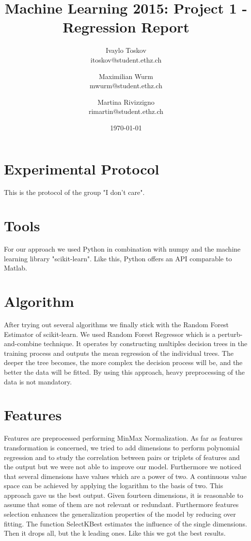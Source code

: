 \documentclass[a4paper, 10pt]{article}
\title{Machine Learning 2015: Project 1 - Regression Report}
\author{Ivaylo Toskov \\ itoskov@student.ethz.ch \and Maximilian Wurm \\ mwurm@student.ethz.ch \and 
	Martina Rivizzigno \\ rimartin@student.ethz.ch\\}
\date{\today}
\begin{document}
\maketitle

\section*{Experimental Protocol}
This is the protocol of the group "I don't care".

\section{Tools}
For our approach we used Python in combination with numpy and the machine learning library "scikit-learn". Like this, Python offers an API comparable to Matlab.

\section{Algorithm}
After trying out several algorithms we finally stick with the Random Forest Estimator of scikit-learn.
We used Random Forest Regressor which is a perturb-and-combine technique. It operates by constructing multiples decision trees in the training process and outputs the mean regression of the individual trees.
The deeper the tree becomes, the more complex the decision process will be, and the better the data will be fitted. By using this approach, heavy preprocessing of the data is not mandatory.

\section{Features}
Features are preprocessed performing MinMax Normalization.
As far as features transformation is concerned, we tried to add dimensions to perform polynomial regression and to study the correlation between pairs or triplets of features and the output but we were not able to improve our model. Furthermore we noticed that several dimensions have values which are a power of two. A continuous value space can be achieved by applying the logarithm to the basis of two. This approach gave us the best output. 
Given fourteen dimensions, it is reasonable to assume that some of them are not relevant or redundant. Furthermore features selection enhances the generalization properties of the model by reducing over fitting. The function SelectKBest estimates the influence of the single dimensions. Then it drops all, but the k leading ones. Like this we got the best results.
\end{document}
